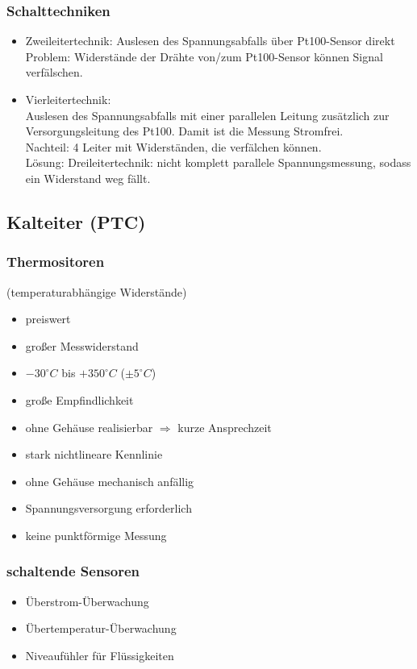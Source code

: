 \documentclass{scrreprt}
\begin{document}
\subsubsection*{Schalttechniken}
\begin{itemize}
\item Zweileitertechnik:
Auslesen des Spannungsabfalls über Pt100-Sensor direkt\\
Problem: Widerstände der Drähte von/zum Pt100-Sensor können Signal verfälschen.
\item Vierleitertechnik:\\
Auslesen des Spannungsabfalls mit einer parallelen Leitung zusätzlich zur Versorgungsleitung des Pt100. Damit ist die Messung Stromfrei. \\
Nachteil: 4 Leiter mit Widerständen, die verfälchen können.\\
Lösung: Dreileitertechnik: nicht komplett parallele Spannungsmessung, sodass ein Widerstand weg fällt.
\end{itemize}
\subsection{Kalteiter (PTC)}
\subsubsection{Thermositoren} (temperaturabhängige Widerstände)
\begin{itemize}[label=$+$]
\item preiswert
\item großer Messwiderstand
\item $-30^\circ C$ bis $+350^\circ C$ ($\pm 5^\circ C$)
\item große Empfindlichkeit
\item ohne Gehäuse realisierbar $\Rightarrow$ kurze Ansprechzeit
\end{itemize}
\begin{itemize}[label=$-$]
\item stark nichtlineare Kennlinie
\item ohne Gehäuse mechanisch anfällig
\item Spannungsversorgung erforderlich
\item keine punktförmige Messung
\end{itemize}
\subsubsection{schaltende Sensoren}
\begin{itemize}
\item Überstrom-Überwachung
\item Übertemperatur-Überwachung
\item Niveaufühler für Flüssigkeiten
\end{itemize}
\end{document}

